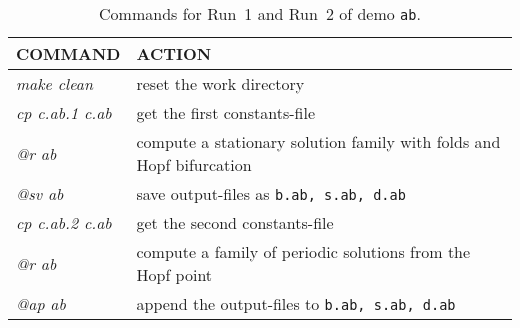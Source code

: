 \documentclass[12pt]{report}
\begin{document}
\begin{table}[htbp]
\begin{center}
\begin{tabular}{| l | l |}
\hline
  COMMAND  & ACTION \\
\hline
  {\it make clean}  & reset the work directory \\ 
\hline
  {\it cp c.ab.1 c.ab} & get the first constants-file \\ 
  {\it @r ab} & compute a stationary solution family with folds and Hopf bifurcation \\ 
  {\it @sv ab} & save output-files as {\tt b.ab, s.ab, d.ab} \\ 
\hline
  {\it cp c.ab.2 c.ab} &  get the second constants-file \\ 
  {\it @r ab} & compute a family of periodic solutions from the Hopf point \\ 
  {\it @ap ab} & append the output-files to {\tt b.ab, s.ab, d.ab} \\ 
\hline
\end{tabular}
\caption{Commands for Run~1 and Run~2 of demo {\tt ab}.}
\label{tbl:demo_ab_5}
\end{center}
\end{table}
 
\end{document}
